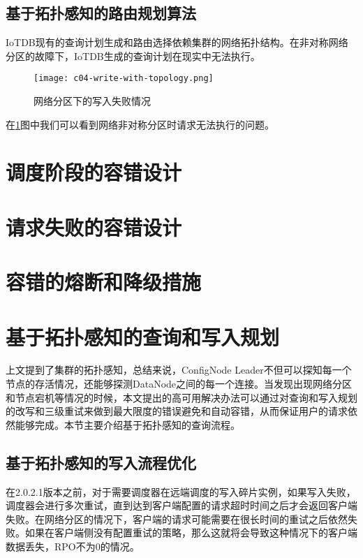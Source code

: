 \subsection{基于拓扑感知的路由规划算法}

IoTDB现有的查询计划生成和路由选择依赖集群的网络拓扑结构。在非对称网络分区的故障下，IoTDB生成的查询计划在现实中无法执行。

\begin{figure}
  \centering
  \texttt{[image: c04-write-with-topology.png]}
  \caption{网络分区下的写入失败情况}
  \label{fig:c04-write-with-topology}
\end{figure}

在\ref{fig:c04-write-with-topology}图中我们可以看到网络非对称分区时请求无法执行的问题。




\section{调度阶段的容错设计}



\section{请求失败的容错设计}

\section{容错的熔断和降级措施}


\section{基于拓扑感知的查询和写入规划}
上文提到了集群的拓扑感知，总结来说，ConfigNode Leader不但可以探知每一个节点的存活情况，还能够探测DataNode之间的每一个连接。当发现出现网络分区和节点宕机等情况的时候，本文提出的高可用解决办法可以通过对查询和写入规划的改写和三级重试来做到最大限度的错误避免和自动容错，从而保证用户的请求依然能够完成。本节主要介绍基于拓扑感知的查询流程。



\subsection{基于拓扑感知的写入流程优化}

在2.0.2.1版本之前，对于需要调度器在远端调度的写入碎片实例，如果写入失败，调度器会进行多次重试，直到达到客户端配置的请求超时时间之后才会返回客户端失败。在网络分区的情况下，客户端的请求可能需要在很长时间的重试之后依然失败。如果在客户端侧没有配置重试的策略，那么这就将会导致这种情况下的客户端数据丢失，RPO不为0的情况。

